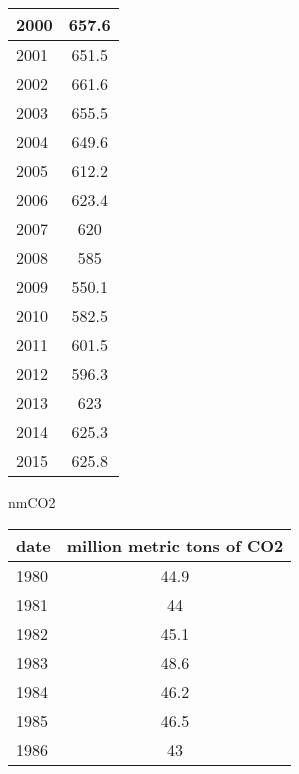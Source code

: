 \documentclass{mcmthesis}
\begin{document}
\begin{appendices}
\begin{minipage}{\textwidth}
\begin{minipage}[t]{0.45\textwidth}
\begin{tabular}{|l|c|}
        2000 & 657.6                      \\ \hline
        2001 & 651.5                      \\ \hline
        2002 & 661.6                      \\ \hline
        2003 & 655.5                      \\ \hline
        2004 & 649.6                      \\ \hline
        2005 & 612.2                      \\ \hline
        2006 & 623.4                      \\ \hline
        2007 & 620                        \\ \hline
        2008 & 585                        \\ \hline
        2009 & 550.1                      \\ \hline
        2010 & 582.5                      \\ \hline
        2011 & 601.5                      \\ \hline
        2012 & 596.3                      \\ \hline
        2013 & 623                        \\ \hline
        2014 & 625.3                      \\ \hline
        2015 & 625.8                      \\ \hline
        \end{tabular}
    \end{minipage}
    \begin{minipage}[t]{0.45\textwidth}
    \centering
          \makeatletter{}\makeatother\caption{nmCO2}
          \begin{tabular}{|l|c|}
            \hline
            date & million metric tons of CO2 \\ \hline
            1980 & 44.9                       \\ \hline
            1981 & 44                         \\ \hline
            1982 & 45.1                       \\ \hline
            1983 & 48.6                       \\ \hline
            1984 & 46.2                       \\ \hline
            1985 & 46.5                       \\ \hline
            1986 & 43                         \\ \hline

\end{tabular}
\end{minipage}
\end{minipage}
\end{appendices}
\end{document}
